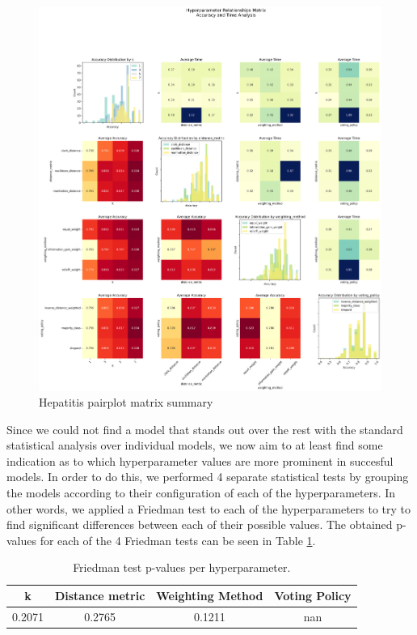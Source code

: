 \begin{figure}[H]
    \centering
    \includegraphics[width=\textwidth]{figures/knn/hepatitis/hyperparameter_pairplot_matrix.png}
    \caption{Hepatitis pairplot matrix summary}
    \label{fig:hep:pairplot}
\end{figure}
\FloatBarrier

Since we could not find a model that stands out over the rest with the standard statistical analysis over individual models, we now aim to at least find some indication as to which hyperparameter values are more prominent in succesful models. In order to do this, we performed 4 separate statistical tests by grouping the models according to their configuration of each of the hyperparameters. In other words, we applied a Friedman test to each of the hyperparameters to try to find significant differences between each of their possible values. The obtained p-values for each of the 4 Friedman tests can be seen in Table \ref{tab:knn:hep:hyperparam}.
\begin{table}[H]
    \centering
    \small
    \begin{tabular}{|c|c|c|c|}
        \hline
        \textbf{k} & \textbf{Distance metric} & \textbf{Weighting Method} & \textbf{Voting Policy} \\ \hline
        0.2071 & 0.2765 & 0.1211 & nan \\ \hline
    \end{tabular}
    \caption{Friedman test p-values per hyperparameter.}
    \label{tab:knn:hep:hyperparam}
\end{table}

